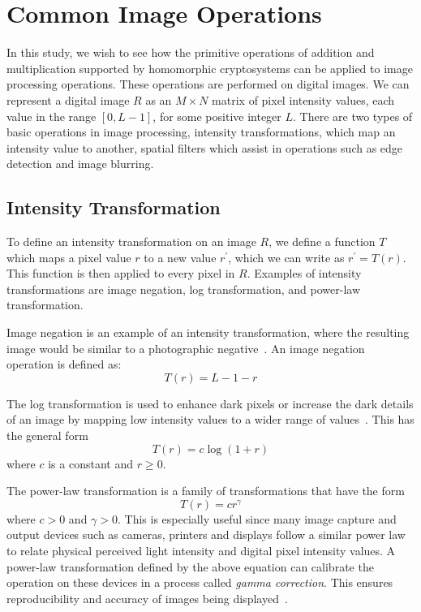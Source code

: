 \section{Common Image Operations}
In this study, we wish to see how the primitive operations of addition and multiplication supported by homomorphic cryptosystems can be applied to image processing operations. These operations are performed on digital images. We can represent a digital image $R$ as an $M \times N$ matrix of pixel intensity values, each value in the range $\left[0, L-1\right]$, for some positive integer $L$. There are two types of basic operations in image processing, intensity transformations, which map an intensity value to another, spatial filters which assist in operations such as edge detection and image blurring.

\subsection{Intensity Transformation}
To define an intensity transformation on an image $R$, we define a function $T$ which maps a pixel value $r$ to a new value $r^\prime$, which we can write as $r^\prime = T\left(r\right)$. This function is then applied to every pixel in $R$. Examples of intensity transformations are image negation, log transformation, and power-law transformation.

Image negation is an example of an intensity transformation, where the resulting image would be similar to a photographic negative~\cite{gonzalez_digital_2008}. An image negation operation is defined as:
\begin{equation}
    T\left(r\right) = L-1-r
\end{equation}

The log transformation is used to enhance dark pixels or increase the dark details of an image by mapping low intensity values to a wider range of values~\cite{gonzalez_digital_2008}. This has the general form
\begin{equation}
    T\left(r\right) = c \log\left(1 + r\right)
\end{equation}
where $c$ is a constant and $r \ge 0$.

The power-law transformation is a family of transformations that have the form
\begin{equation}
    T\left(r\right) = c r^{\gamma}
\end{equation}
where $c>0$ and $\gamma > 0$. This is especially useful since many image capture and output devices such as cameras, printers and displays follow a similar power law to relate physical perceived light intensity and digital pixel intensity values. A power-law transformation defined by the above equation can calibrate the operation on these devices in a process called \textit{gamma correction}. This ensures reproducibility and accuracy of images being displayed~\cite{gonzalez_digital_2008}.

